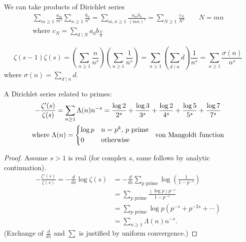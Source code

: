 \documentclass{article}
\newenvironment{manual}[1]{%
    \renewcommand\themanualinner{#1}%
    \manualinner
}{\endmanualinner}
\begin{document}
We can take products of Dirichlet series
\begin{align*}
    \sum_{m \geq 1} \frac{a_m}{m^s} \sum_{n \geq 1} \frac{b_n}{n^s} = \sum_{m,n\geq 1} \frac{a_m b_n}{(mn)^s} = \sum_{N \geq 1} \frac{c_N}{N^s} \qquad N=mn \\
    \text{where } c_N = \sum_{d \mid N} a_d b_{\frac{N}{d}}
\end{align*}

\begin{eg}
    \begin{equation*}
        \zeta(s-1) \zeta(s) = (\sum_{n \geq 1} \frac{n}{n^s})(\sum_{n \geq 1} \frac{1}{n^s}) = \sum_{n \geq 1} (\sum_{d \mid n} d) \frac{1}{n^s} = \sum_{n \geq 1} \frac{\sigma(n)}{n^s}
    \end{equation*}
    where $\sigma(n) = \sum_{d \mid n} d$.
\end{eg}

A Dirichlet series related to primes:
\begin{manual}{Theorem 5.5a}\label{thm:5.5a}
    \begin{gather*}
        -\frac{\zeta'(s)}{\zeta(s)} = \sum_{n \geq 1} \Lambda(n) n^{-s} = \frac{\log 2}{2^s} + \frac{\log 3}{3^s} + \frac{\log 2}{4^s} + \frac{\log 5}{5^s} + \frac{\log 7}{7^s} \\
        \text{where } \Lambda(n) =
        \begin{cases*}
            \log p & $n = p^k$, $p$ prime \\
            0 & otherwise
        \end{cases*}
        \text{ von Mangoldt function}
    \end{gather*}
\end{manual}

\begin{proof}
    Assume $s > 1$ is real (for complex $s$, same follows by analytic continuation).
    \begin{align*}
        -\frac{\zeta'(s)}{\zeta(s)} = - \frac{d}{ds} \log \zeta(s) &= - \frac{d}{ds} \sum_{p \text{ prime}} \log\left(\frac{1}{1 - p^{-s}}\right) \tag{by Euler product} \\
                                                                   &= \sum_{p \text{ prime}} \frac{(\log p) p^{-s}} {1 - p^{-s}} \\
                                                                   &= \sum_{p \text{ prime}} \log p (p^{-s} + p^{-2s} + \dotsb) \\
                                                                   &= \sum_{n \geq 1} \Lambda(n) n^{-s}.
    \end{align*}
    (Exchange of $\frac{d}{ds}$ and $\sum$ is justified by uniform convergence.)
\end{proof}
\end{document}
